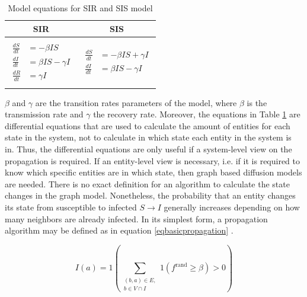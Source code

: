 \begin{table}[ht!]
    \centering
    \begin{tabular}{|c | c |} 
     \hline
     SIR & SIS  \\ 
     \hline
     & \\
     $\begin{aligned}
          \frac{dS}{dt} &= -\beta I S \\
          \frac{dI}{dt} &= \beta I S - \gamma I \\
          \frac{dR}{dt} &= \gamma I  
        \end{aligned}$
      &
      $\begin{aligned}
          \frac{dS}{dt} &= -\beta I S + \gamma I\\
          \frac{dI}{dt} &= \beta I S - \gamma I
        \end{aligned}$
       \\ 
       & \\
     \hline
    \end{tabular}
    \caption{Model equations for SIR and SIS model \cite{sirequation}}
    \label{SI-table-equations}
\end{table}

$\beta$ and $\gamma$ are the transition rates parameters of the model, where 
$\beta$ is the transmission rate and $\gamma$ the 
recovery rate. Moreover, the equations in Table \ref{SI-table-equations}
are differential equations that are used to calculate the amount
of entities for each state in the system, not to calculate in which state
each entity in the system is in. Thus, the differential equations are 
only useful if a system-level view on the propagation is required.
If an entity-level view is necessary, i.e. if it is required to know which 
specific entities are in which state, then graph based diffusion models are needed.
There is no exact definition for an algorithm to calculate the state changes in the
graph model. Nonetheless, the probability that an entity changes
its state from susceptible to infected $S \to I$ generally increases depending on
how many neighbors are already infected. In its simplest form, a
propagation algorithm may be defined as in equation \ref{eqbasicpropagation} 
\cite{easypropagation}.

\begin{equation}
    I(a) = 1 (\sum\limits_{\substack{(b,a)\in E, \\ b \in V \cap I}}
    1(f^{\mathrm{rand}}\geq \beta)>0) 
    \label{eqbasicpropagation}
\end{equation}

